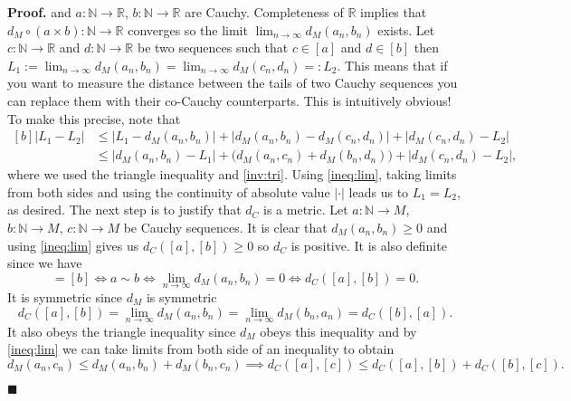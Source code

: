\documentclass[10pt]{article}
\theoremstyle{definition}
\theoremstyle{remark}
\newenvironment{prf}{\noindent\textbf{Proof.}}{\hfill$\blacksquare$}
\begin{document}
\begin{prf}
and $a:\mathbb{N}\to\mathbb{R}$, $b:\mathbb{N}\to\mathbb{R}$ are Cauchy. Completeness of $\mathbb{R}$ implies that $d_M\circ(a\times b):\mathbb{N}\to \mathbb{R}$ converges so the limit $\lim_{n\to\infty}d_M(a_n,b_n)$ exists. Let $c:\mathbb{N}\to\mathbb{R}$ and $d:\mathbb{N}\to\mathbb{R}$ be two sequences such that $c\in [a]$ and $d\in [b]$ then $L_1:=\lim_{n\to\infty}d_M(a_n,b_n)=\lim_{n\to\infty}d_M(c_n,d_n)=:L_2$. This means that if you want to measure the distance between the tails of two Cauchy sequences you can replace them with their co-Cauchy counterparts. This is intuitively obvious! To make this precise, note that
\begin{equation}
\begin{aligned}[b]
\left|L_1-L_2\right|&\leq\left|L_1-d_M(a_n,b_n)\right|+\left|d_M(a_n,b_n)-d_M(c_n,d_n)\right|+\left|d_M(c_n,d_n)-L_2\right| \\
&\leq \left|d_M(a_n,b_n)-L_1\right|+\big(d_M(a_n,c_n)+d_M(b_n,d_n)\big)+\left|d_M(c_n,d_n)-L_2\right|,
\end{aligned}
\end{equation}
where we used the triangle inequality and \cref{inv:tri}. Using \cref{ineq:lim}, taking limits from both sides and using the continuity of absolute value $|\cdot|$ leads us to $L_1=L_2$, as desired. The next step is to justify that $d_C$ is a metric. Let $a:\mathbb{N}\to M$, $b:\mathbb{N}\to M$, $c:\mathbb{N}\to M$ be Cauchy sequences. It is clear that $d_M(a_n,b_n)\ge 0$ and using \cref{ineq:lim} gives us $d_C([a],[b])\ge 0$ so $d_C$ is positive. It is also definite since we have
\begin{equation}
[a]=[b] \iff a\sim b \iff \lim_{n\to\infty}d_M(a_n,b_n)=0 \iff d_C([a],[b])=0.
\end{equation}
It is symmetric since $d_M$ is symmetric 
\begin{equation}
d_C([a],[b])=\lim_{n\to\infty}d_M(a_n,b_n)=\lim_{n\to\infty}d_M(b_n,a_n)=d_C([b],[a]).
\end{equation}
It also obeys the triangle inequality since $d_M$ obeys this inequality and by \cref{ineq:lim} we can take limits from both side of an inequality to obtain
\begin{equation}
d_M(a_n,c_n)\leq d_M(a_n,b_n)+d_M(b_n,c_n) \implies
d_C([a],[c])\leq d_C([a],[b])+d_C([b],[c]).
\end{equation}


\end{prf}
\end{document}
